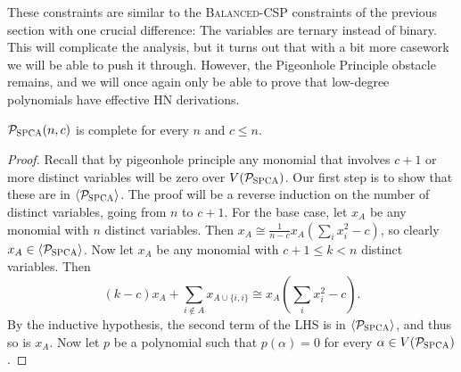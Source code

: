These constraints are similar to the \textsc{Balanced-CSP} constraints of the previous section with one crucial difference: The variables are ternary instead of binary.
This will complicate the analysis, but it turns out that with a bit more casework we will be able to push it through.
However, the Pigeonhole Principle obstacle remains, and we will once again only be able to prove that low-degree polynomials have effective HN derivations.
\begin{lemma}\label{lem:bspca-complete}
$\mathcal P_{\textsc{SPCA}}(n,c)$ is complete for every $n$ and $c \leq n$.
\end{lemma}
\begin{proof}
Recall that by pigeonhole principle any monomial that involves $c+1$ or more distinct variables will be zero over $V(\mathcal P_{\textsc{SPCA}})$. Our first step is to show that these are in $\langle \mathcal P_{\textsc{SPCA}} \rangle$. The proof will be a reverse induction on the number of distinct variables, going from $n$ to $c+1$.  
For the base case, let $x_A$ be any monomial with $n$ distinct variables. Then $x_A \cong \frac{1}{n-c} x_A(\sum_i x_i^2 - c)$, so clearly $x_A \in \langle \mathcal P_{\textsc{SPCA}} \rangle$.
Now let $x_A$ be any monomial with $c+1 \leq k < n$ distinct variables. Then
\[\left(k-c\right)x_A + \sum_{i \notin A} x_{A \cup \{i,i\}} \cong x_A\left(\sum_i x^2_i - c\right).\]
By the inductive hypothesis, the second term of the LHS is in $\langle \mathcal P_{\textsc{SPCA}} \rangle$, and thus so is $x_A$. 
Now let $p$ be a polynomial such that $p(\alpha) = 0$ for every $\alpha \in V(\mathcal P_{\textsc{SPCA}})$. 

\end{proof}
